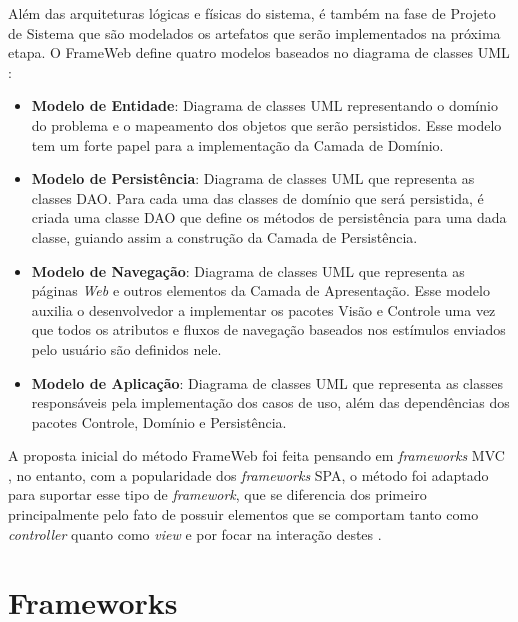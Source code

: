 Além das arquiteturas lógicas e físicas do sistema, é também na fase de Projeto de Sistema
que são modelados os artefatos que serão implementados na próxima etapa. O FrameWeb define
quatro modelos baseados no diagrama de classes UML \cite{souza:2007,souza:2020}:


\begin{itemize}
    \item \textbf{Modelo de Entidade}: Diagrama de classes UML representando o domínio do 
        problema e o mapeamento dos objetos que serão persistidos. Esse modelo tem um forte
        papel para a implementação da Camada de Domínio.

    \item \textbf{Modelo de Persistência}: Diagrama de classes UML que representa as classes
        DAO. Para cada uma das classes de domínio que será persistida, é criada uma classe DAO
        que define os métodos de persistência para uma dada classe, guiando assim a 
        construção da Camada de Persistência.
    
    \item \textbf{Modelo de Navegação}: Diagrama de classes UML que representa as páginas \textit{Web}
        e outros elementos da Camada de Apresentação. Esse modelo auxilia o desenvolvedor a
        implementar os pacotes Visão e Controle uma vez que todos os atributos e fluxos de 
        navegação baseados nos estímulos enviados pelo usuário são definidos nele. 

    \item \textbf{Modelo de Aplicação}: Diagrama de classes UML que representa as classes
        responsáveis pela implementação dos casos de uso, além das dependências dos pacotes
        Controle, Domínio e Persistência.
\end{itemize}

A proposta inicial do método FrameWeb foi feita pensando em \textit{frameworks} MVC \cite{souza:2007}, 
no entanto, com a popularidade dos \textit{frameworks} SPA, o método foi adaptado para suportar
esse tipo de \textit{framework}, que se diferencia dos primeiro principalmente pelo fato de possuir elementos que se comportam tanto como \textit{controller} quanto como 
\textit{view} e por focar na interação destes \cite{hoppe:2023}.


\section{Frameworks}
\label{sec-fundteo-framework}

